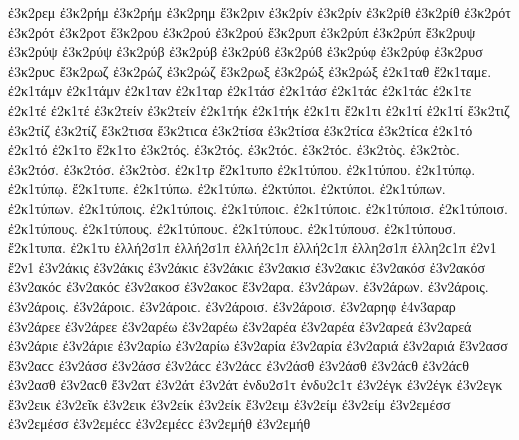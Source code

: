 {ἐ3κ2ρεμ
ἐ3κ2ρήμ ἐ3κ2ρήμ   %
ἐ3κ2ρημ
ἔ3κ2ριν   %
ἐ3κ2ρίν ἐ3κ2ρίν
ἐ3κ2ρίθ ἐ3κ2ρίθ
ἐ3κ2ρότ ἐ3κ2ρότ   %
ἐ3κ2ροτ
ἔ3κ2ρου   %
ἐ3κ2ρού ἐ3κ2ρού
ἔ3κ2ρυπ   %
ἐ3κ2ρύπ ἐ3κ2ρύπ   %
ἔ3κ2ρυψ
ἐ3κ2ρύψ ἐ3κ2ρύψ
ἐ3κ2ρύβ ἐ3κ2ρύβ ἐ3κ2ρύϐ ἐ3κ2ρύϐ
ἐ3κ2ρύφ ἐ3κ2ρύφ
ἐ3κ2ρυσ ἐ3κ2ρυϲ   %
ἔ3κ2ρωζ   %
ἐ3κ2ρώζ ἐ3κ2ρώζ
ἔ3κ2ρωξ   %
ἐ3κ2ρώξ ἐ3κ2ρώξ
ἐ2κ1ταθ   %
ἔ2κ1ταμε.   %
ἐ2κ1τάμν ἐ2κ1τάμν   %
ἐ2κ1ταν   %
ἐ2κ1ταρ   %
ἐ2κ1τάσ ἐ2κ1τάσ ἐ2κ1τάϲ ἐ2κ1τάϲ   %
ἐ2κ1τε
ἐ2κ1τέ ἐ2κ1τέ
ἐ3κ2τείν ἐ3κ2τείν   %
ἐ2κ1τήκ ἐ2κ1τήκ   %
ἐ2κ1τι
ἔ2κ1τι
ἐ2κ1τί ἐ2κ1τί
ἔ3κ2τιζ   %
ἐ3κ2τίζ ἐ3κ2τίζ
ἔ3κ2τισα ἔ3κ2τιϲα   %
ἐ3κ2τίσα ἐ3κ2τίσα ἐ3κ2τίϲα ἐ3κ2τίϲα
ἐ2κ1τό ἐ2κ1τό
ἐ2κ1το
ἔ2κ1το
ἐ3κ2τός. ἐ3κ2τός. ἐ3κ2τόϲ. ἐ3κ2τόϲ.   %
ἐ3κ2τὸς. ἐ3κ2τὸϲ.
ἐ3κ2τόσ. ἐ3κ2τόσ.
ἐ3κ2τὸσ.
ἐ2κ1τρ
ἔ2κ1τυπο   %
ἐ2κ1τύπου. ἐ2κ1τύπου.
ἐ2κ1τύπῳ. ἐ2κ1τύπῳ.
ἔ2κ1τυπε.
ἐ2κ1τύπω. ἐ2κ1τύπω.
ἐ2κτύποι. ἐ2κτύποι.
ἐ2κ1τύπων. ἐ2κ1τύπων.
ἐ2κ1τύποις. ἐ2κ1τύποις. ἐ2κ1τύποιϲ. ἐ2κ1τύποιϲ.
ἐ2κ1τύποισ. ἐ2κ1τύποισ.
ἐ2κ1τύπους. ἐ2κ1τύπους. ἐ2κ1τύπουϲ. ἐ2κ1τύπουϲ.
ἐ2κ1τύπουσ. ἐ2κ1τύπουσ.
ἔ2κ1τυπα.
ἐ2κ1τυ
ἑλλή2σ1π ἑλλή2σ1π ἑλλή2ϲ1π ἑλλή2ϲ1π   %
ἑλλη2σ1π ἑλλη2ϲ1π
ἐ2ν1
ἔ2ν1
ἐ3ν2άκις ἐ3ν2άκις ἐ3ν2άκιϲ ἐ3ν2άκιϲ   %
ἐ3ν2ακισ ἐ3ν2ακιϲ   %
ἐ3ν2ακόσ ἐ3ν2ακόσ ἐ3ν2ακόϲ ἐ3ν2ακόϲ   %
ἐ3ν2ακοσ ἐ3ν2ακοϲ
ἔ3ν2αρα.   %
ἐ3ν2άρων. ἐ3ν2άρων.
ἐ3ν2άροις. ἐ3ν2άροις. ἐ3ν2άροιϲ. ἐ3ν2άροιϲ.
ἐ3ν2άροισ. ἐ3ν2άροισ.
ἐ3ν2αρηφ   %
ἐ4ν3αραρ   %
ἐ3ν2άρεε ἐ3ν2άρεε   %
ἐ3ν2αρέω ἐ3ν2αρέω
ἐ3ν2αρέα ἐ3ν2αρέα   %
ἐ3ν2αρεά ἐ3ν2αρεά
ἐ3ν2άριε ἐ3ν2άριε   %
ἐ3ν2αρίω ἐ3ν2αρίω
ἐ3ν2αρία ἐ3ν2αρία   %
ἐ3ν2αριά ἐ3ν2αριά
ἔ3ν2ασσ ἔ3ν2αϲϲ   %
ἐ3ν2άσσ ἐ3ν2άσσ ἐ3ν2άϲϲ ἐ3ν2άϲϲ
ἐ3ν2άσθ ἐ3ν2άσθ ἐ3ν2άϲθ ἐ3ν2άϲθ
ἐ3ν2ασθ ἐ3ν2αϲθ
ἔ3ν2ατ   %
ἐ3ν2άτ ἐ3ν2άτ
ἐνδυ2σ1τ ἐνδυ2ϲ1τ   %
ἐ3ν2έγκ ἐ3ν2έγκ   %
ἐ3ν2εγκ   %
ἔ3ν2εικ   %
ἐ3ν2εῖκ   %
ἐ3ν2εικ   %
ἐ3ν2είκ ἐ3ν2είκ   %
ἔ3ν2ειμ   %
ἐ3ν2είμ ἐ3ν2είμ
ἐ3ν2εμέσσ ἐ3ν2εμέσσ ἐ3ν2εμέϲϲ ἐ3ν2εμέϲϲ   %
ἐ3ν2εμήθ ἐ3ν2εμήθ   %
}
